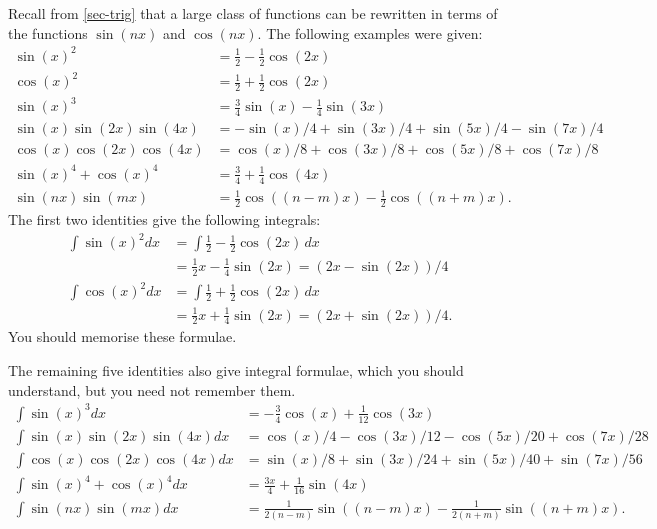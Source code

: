 \documentclass[a4paper]{book}
\theoremstyle{definition}
\begin{document}
Recall from \autoref{sec-trig} that a large class of functions
can be rewritten in terms of the functions $\sin(nx)$ and $\cos(nx)$.
The following examples were given:
\begin{align*}
 \sin(x)^2 &= \tfrac{1}{2} - \tfrac{1}{2}\cos(2x) \\
 \cos(x)^2 &= \tfrac{1}{2} + \tfrac{1}{2}\cos(2x) \\
 \sin(x)^3 &= \tfrac{3}{4}\sin(x) - \tfrac{1}{4}\sin(3x) \\
 \sin(x)\sin(2x)\sin(4x)
  &= -\sin(x)/4 + \sin(3x)/4 + \sin(5x)/4 - \sin(7x)/4 \\
 \cos(x)\cos(2x)\cos(4x)
  &= \cos(x)/8 + \cos(3x)/8 + \cos(5x)/8 + \cos(7x)/8 \\
 \sin(x)^4 + \cos(x)^4
  &= \tfrac{3}{4} + \tfrac{1}{4}\cos(4x) \\
 \sin(nx)\sin(mx) &=
  \tfrac{1}{2}\cos((n-m)x) - \tfrac{1}{2}\cos((n+m)x).
\end{align*}
The first two identities give the following integrals:
\begin{align*}
 \int \sin(x)^2 dx
  &= \int \tfrac{1}{2} -\tfrac{1}{2} \cos(2x) \,dx \\
  &= \tfrac{1}{2}x - \tfrac{1}{4}\sin(2x) 
   = (2x-\sin(2x))/4 \\
 \int \cos(x)^2 dx
  &= \int \tfrac{1}{2} +\tfrac{1}{2} \cos(2x) \,dx \\
  &= \tfrac{1}{2}x + \tfrac{1}{4}\sin(2x)
   = (2x+\sin(2x))/4.
\end{align*}
You should memorise these formulae.

The remaining five identities also give integral formulae, which you
should understand, but you need not remember them.
\begin{align*}
 \int \sin(x)^3 dx &=
  -\tfrac{3}{4}\cos(x) + \tfrac{1}{12}\cos(3x) \\
 \int \sin(x)\sin(2x)\sin(4x) dx
  &= \cos(x)/4 - \cos(3x)/12 - \cos(5x)/20 + \cos(7x)/28 \\
 \int \cos(x)\cos(2x)\cos(4x) dx
  &= \sin(x)/8 + \sin(3x)/24 + \sin(5x)/40 + \sin(7x)/56 \\
 \int \sin(x)^4 + \cos(x)^4 dx
  &= \tfrac{3x}{4} + \tfrac{1}{16}\sin(4x) \\
 \int \sin(nx)\sin(mx) dx &=
  \tfrac{1}{2(n-m)}\sin((n-m)x) - \tfrac{1}{2(n+m)}\sin((n+m)x).
\end{align*}
\end{document}
